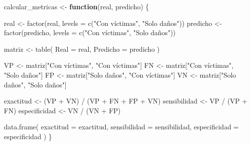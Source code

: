 \documentclass[
  11pt,
  letterpaper,
]{book}
\newenvironment{Shaded}{\begin{snugshade}}{\end{snugshade}}
\newcommand{\AttributeTok}[1]{\textcolor[rgb]{0.40,0.45,0.13}{#1}}
\newcommand{\ControlFlowTok}[1]{\textcolor[rgb]{0.00,0.23,0.31}{\textbf{#1}}}
\newcommand{\FunctionTok}[1]{\textcolor[rgb]{0.28,0.35,0.67}{#1}}
\newcommand{\NormalTok}[1]{\textcolor[rgb]{0.00,0.23,0.31}{#1}}
\newcommand{\OtherTok}[1]{\textcolor[rgb]{0.00,0.23,0.31}{#1}}
\newcommand{\SpecialCharTok}[1]{\textcolor[rgb]{0.37,0.37,0.37}{#1}}
\newcommand{\StringTok}[1]{\textcolor[rgb]{0.13,0.47,0.30}{#1}}
\begin{document}
\begin{Shaded}
\begin{Highlighting}[]
\NormalTok{calcular\_metricas }\OtherTok{\textless{}{-}} \ControlFlowTok{function}\NormalTok{(real, predicho) \{}

\NormalTok{  real }\OtherTok{\textless{}{-}} \FunctionTok{factor}\NormalTok{(real, }\AttributeTok{levels =} \FunctionTok{c}\NormalTok{(}\StringTok{"Con víctimas"}\NormalTok{, }\StringTok{"Solo daños"}\NormalTok{))}
\NormalTok{  predicho }\OtherTok{\textless{}{-}} \FunctionTok{factor}\NormalTok{(predicho, }\AttributeTok{levels =} \FunctionTok{c}\NormalTok{(}\StringTok{"Con víctimas"}\NormalTok{, }\StringTok{"Solo daños"}\NormalTok{))}

\NormalTok{  matriz }\OtherTok{\textless{}{-}} \FunctionTok{table}\NormalTok{(}
    \AttributeTok{Real =}\NormalTok{ real,}
    \AttributeTok{Predicho =}\NormalTok{ predicho}
\NormalTok{  )}

\NormalTok{  VP }\OtherTok{\textless{}{-}}\NormalTok{ matriz[}\StringTok{"Con víctimas"}\NormalTok{, }\StringTok{"Con víctimas"}\NormalTok{]}
\NormalTok{  FN }\OtherTok{\textless{}{-}}\NormalTok{ matriz[}\StringTok{"Con víctimas"}\NormalTok{, }\StringTok{"Solo daños"}\NormalTok{]}
\NormalTok{  FP }\OtherTok{\textless{}{-}}\NormalTok{ matriz[}\StringTok{"Solo daños"}\NormalTok{, }\StringTok{"Con víctimas"}\NormalTok{]}
\NormalTok{  VN }\OtherTok{\textless{}{-}}\NormalTok{ matriz[}\StringTok{"Solo daños"}\NormalTok{, }\StringTok{"Solo daños"}\NormalTok{]}

\NormalTok{  exactitud }\OtherTok{\textless{}{-}}\NormalTok{ (VP }\SpecialCharTok{+}\NormalTok{ VN) }\SpecialCharTok{/}\NormalTok{ (VP }\SpecialCharTok{+}\NormalTok{ FN }\SpecialCharTok{+}\NormalTok{ FP }\SpecialCharTok{+}\NormalTok{ VN)}
\NormalTok{  sensibilidad }\OtherTok{\textless{}{-}}\NormalTok{ VP }\SpecialCharTok{/}\NormalTok{ (VP }\SpecialCharTok{+}\NormalTok{ FN)}
\NormalTok{  especificidad }\OtherTok{\textless{}{-}}\NormalTok{ VN }\SpecialCharTok{/}\NormalTok{ (VN }\SpecialCharTok{+}\NormalTok{ FP)}

  \FunctionTok{data.frame}\NormalTok{(}
    \AttributeTok{exactitud =}\NormalTok{ exactitud,}
    \AttributeTok{sensibilidad =}\NormalTok{ sensibilidad,}
    \AttributeTok{especificidad =}\NormalTok{ especificidad}
\NormalTok{  )}
\NormalTok{\}}
\end{Highlighting}
\end{Shaded}
\end{document}
